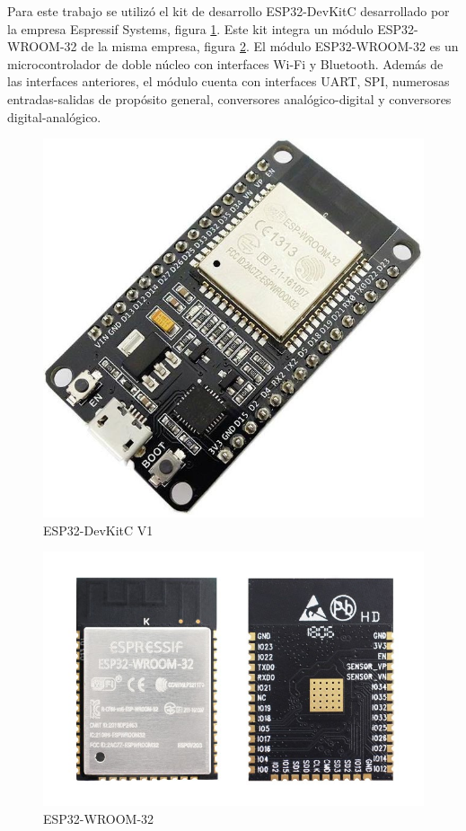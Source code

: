 Para este trabajo se utilizó el kit de desarrollo ESP32-DevKitC \citep{ESP32} desarrollado por la empresa Espressif Systems, figura \ref{fig:ESP32DevKitC}. Este kit integra un módulo ESP32-WROOM-32 \citep{WROOM} de la misma empresa, figura \ref{fig:ESP32WROOM}. El módulo ESP32-WROOM-32 es un microcontrolador de doble núcleo con interfaces Wi-Fi y Bluetooth. Además de las interfaces anteriores, el módulo cuenta con interfaces UART, SPI, numerosas entradas-salidas de propósito general, conversores analógico-digital y conversores digital-analógico.

\begin{figure}[htpb]
	\centering
	\includegraphics[scale=1.2]{./Figures/ESP32DevKit.jpg}
	\caption{ESP32-DevKitC V1}
	\label{fig:ESP32DevKitC}
\end{figure}

\begin{figure}[htpb]
	\centering
	\includegraphics[scale=.5]{./Figures/esp32-wroom-32-front-back.jpg}
	\caption{ESP32-WROOM-32}
	\label{fig:ESP32WROOM}
\end{figure}

